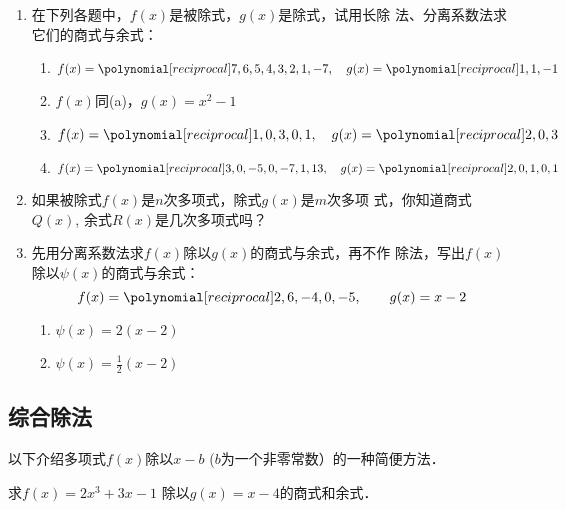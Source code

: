 \begin{ex}
\begin{enumerate}
    \item 在下列各题中，$f(x)$是被除式，$g(x)$是除式，试用长除
    法、分离系数法求它们的商式与余式：
    \begin{enumerate}
        \item $f(x)=\poly{7,6,5,4,3,2,1,-7},\quad g(x)=\poly{1,1,-1}$
        \item $f(x)$同(a)，$g(x)=x^2-1$
        \item $f(x)=\poly{1,0,3,0,1},\quad g(x)=\poly{2,0,3}$
        \item $f(x)=\poly{3,0,-5,0,-7,1,13},\quad g(x)=\poly{2,0,1,0,1}$
    \end{enumerate}

    \item 如果被除式$f(x)$是$n$次多项式，除式$g(x)$是$m$次多项
    式，你知道商式$Q(x)$, 余式$R(x)$是几次多项式吗？
    \item 先用分离系数法求$f(x)$除以$g(x)$的商式与余式，再不作
    除法，写出$f(x)$除以$\psi(x)$的商式与余式：
    \[f(x)=\poly{2,6,-4,0,-5},\qquad g(x)=x-2\]
\begin{enumerate}
    \item $\psi(x)=2(x-2)$
    \item $\psi(x)=\frac{1}{2}(x-2)$
\end{enumerate}

\end{enumerate}

\end{ex}



   \subsection{综合除法}
    以下介绍多项式$f(x)$除以$x-b$ ($b$为一个非零常数）的一种简便方法．
\begin{example}
    求$f(x)=2x^3+3x-1$ 除以$g(x)=x-4$的商式和余式．
\end{example}

